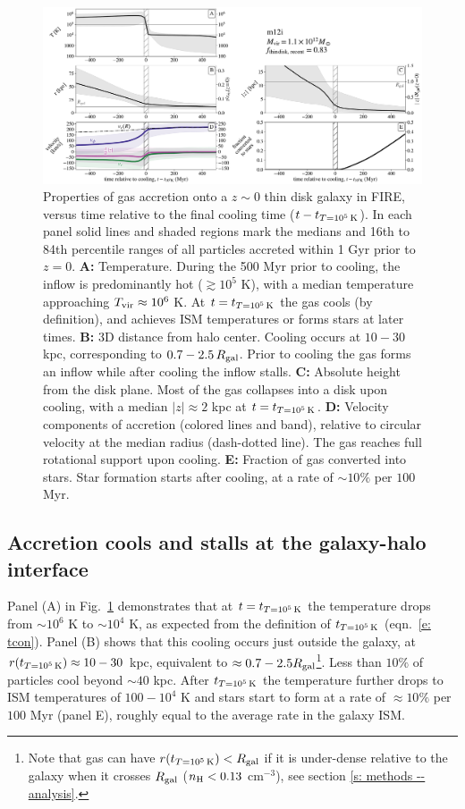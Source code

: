 \documentclass[fleqn,usenatbib]{mnras}
\newcommand{\tcon}{t_{T=10^5\,{\rm K}}}
\newcommand{\Tvir}{T_{\rm vir}}
\begin{document}
\begin{figure}
\includegraphics[width=\textwidth]{figures/before_and_after/before_and_after_characteristics_m12i_md.pdf}
\caption{
Properties of gas accretion onto a $z\sim0$ thin disk galaxy in FIRE, versus time relative to the final cooling time ($t - \tcon$).
In each panel solid lines and shaded regions mark the medians and 16th to 84th percentile ranges of all particles accreted within 1 Gyr prior to $z=0$. 
\textbf{A:}
Temperature.
During the 500 Myr prior to cooling, the inflow is predominantly hot ($\gtrsim 10^5$ K), with a median temperature approaching $\Tvir\approx10^6$ K.
At $t = \tcon$ the gas cools (by definition), and achieves ISM temperatures or forms stars at later times. 
\textbf{B:}
3D distance from halo center.
Cooling occurs at $10-30$ kpc, corresponding to $0.7-2.5\,R_{\rm gal}$.
Prior to cooling the gas forms an inflow while after cooling the inflow stalls.
\textbf{C:}
Absolute height from the disk plane.
Most of the gas collapses into a disk upon cooling, with a median $\vert z \vert \approx 2$ kpc at $t=\tcon$.
\textbf{D:}
Velocity components of accretion (colored lines and band), relative to circular velocity at the median radius (dash-dotted line).
The gas reaches full rotational support upon cooling.
\textbf{E:}
Fraction of gas converted into stars.
Star formation starts after cooling, at a rate of $\sim10\%$ per $100$ Myr. 
}
\label{f: before and after A}
\end{figure}


\subsection{Accretion cools and stalls at the galaxy-halo interface}
\label{s: characteristics -- cools}

Panel (A) in Fig.~\ref{f: before and after A} demonstrates that at $t = \tcon$ the temperature drops from $\sim10^6$ K to $\sim10^4$ K,  as expected from the definition of $\tcon$ (eqn.~\ref{e: tcon}).
Panel (B) shows that this cooling occurs just outside the galaxy, at $r(\tcon) \approx 10-30$ kpc, equivalent to $\approx0.7 - 2.5 R_{\rm gal}$\footnote{Note that gas can have $r(\tcon) < R_{\rm gal}$ if it is under-dense relative to the galaxy when it crosses $R_{\rm gal}$ ($n_{\rm H} < 0.13$ cm$^{-3}$), see section \ref{s: methods -- analysis}.}.
Less than $10\%$ of particles cool beyond $\sim 40$ kpc.
After $\tcon$ the temperature further drops to ISM temperatures of $100-10^4$ K and stars start to form at a rate of $\approx10\%$ per $100$ Myr (panel E), roughly equal to the average rate in the galaxy ISM. 
\end{document}

